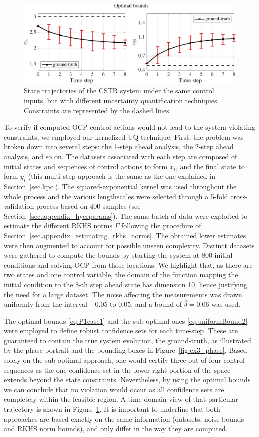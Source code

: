 \begin{figure}[t]
	\includegraphics[scale=0.4]{../images/chap2_numex_ex3_time_opt.pdf}
	\caption{State trajectories of the CSTR system under the same control inputs, but with different uncertainty quantification techniques. Constraints are represented by the dashed lines.}
	\label{fig:ex3_time}
\end{figure}

To verify if computed OCP control actions would not lead to the system violating constraints, we employed our kernelized UQ technique. First, the problem was broken down into several steps: the 1-step ahead analysis, the 2-step ahead analysis, and so on. The datasets associated with each step are composed of initial states and sequences of control actions to form $x_i$, and the final state to form $y_i$ (this multi-step approach is the same as the one explained in Section~\ref{sec.kpc}). The squared-exponential kernel was used throughout the whole process and the various lengthscales were selected through a 5-fold cross-validation process based on 400 samples (see Section~\ref{sec.appendix_hyerparams}). The same batch of data were exploited to estimate the different RKHS norms $\Gamma$ following the procedure of Section~\ref{sec.appendix_estimating_rkhs_norms}. The obtained lower estimates were then augmented to account for possible unseen complexity. Distinct datasets were gathered to compute the bounds by starting the system at $800$ initial conditions and solving OCP from those locations. We highlight that, as there are two states and one control variable, the domain of the function mapping the initial condition to the 8-th step ahead state has dimension 10, hence justifying the need for a large dataset. The noise affecting the measurements was drawn uniformly from the interval $-0.05$ to $0.05$, and a bound of $\bar \delta = 0.06$ was used.

The optimal bounds \eqref{eq.P1case1} and the sub-optimal ones \eqref{eq.uniformBound2} were employed to define robust confidence sets for each time-step. These are guaranteed to contain the true system evolution, the ground-truth, as illustrated by the phase portrait and the bounding boxes in Figure~\ref{fig:ex3_phase}. Based solely on the sub-optimal approach, one would certify three out of four control sequences as the one confidence set in the lower right portion of the space extends beyond the state constraints. Nevertheless, by using the optimal bounds we can conclude that no violation would occur as all confidence sets are completely within the feasible region. A time-domain view of that particular trajectory is shown in Figure~\ref{fig:ex3_time}. It is important to underline that both approaches are based exactly on the same information (datasets, noise bounds and RKHS norm bounds), and only differ in the way they are computed.

